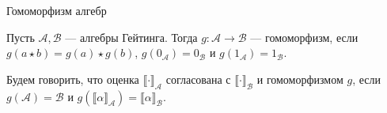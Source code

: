 \documentclass[aspectratio=169]{beamer}
\begin{document}
\begin{comment}
%
\end{frame}
\end{comment}

\begin{frame}{Гомоморфизм алгебр}
\begin{defrus}Пусть $\mathcal{A}, \mathcal{B}$ --- алгебры Гейтинга. Тогда $g: \mathcal{A} \rightarrow \mathcal{B}$ --- гомоморфизм,
если $g(a \star b) = g(a) \star g(b)$, $g(0_\mathcal{A}) = 0_\mathcal{B}$ и $g(1_\mathcal{A}) = 1_\mathcal{B}$.\end{defrus}
\begin{defrus}Будем говорить, что оценка $\llbracket\cdot\rrbracket_\mathcal{A}$ согласована
с $\llbracket\cdot\rrbracket_\mathcal{B}$ и гомоморфизмом $g$, если $g(\mathcal{A}) = \mathcal{B}$ и
$g(\llbracket\alpha\rrbracket_\mathcal{A}) = \llbracket\alpha\rrbracket_\mathcal{B}$.
\end{defrus}
\end{frame}
\end{document}
